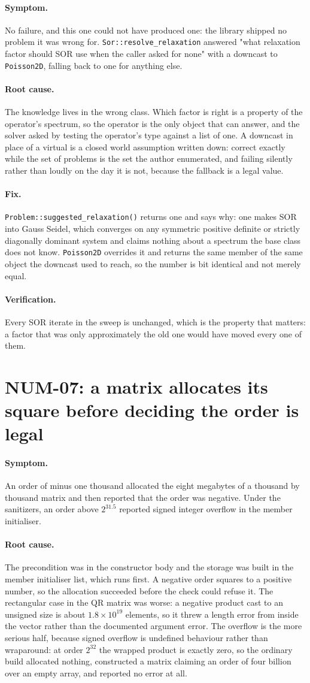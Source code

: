 \documentclass[11pt,a4paper]{report}
\newcommand{\symptom}[1]{\paragraph{Symptom.}#1}
\newcommand{\rootcause}[1]{\paragraph{Root cause.}#1}
\newcommand{\fix}[1]{\paragraph{Fix.}#1}
\newcommand{\verification}[1]{\paragraph{Verification.}#1}
\begin{document}
\symptom{No failure, and this one could not have produced one: the library
shipped no problem it was wrong for. \texttt{Sor::resolve\_relaxation} answered
"what relaxation factor should SOR use when the caller asked for none" with a
downcast to \texttt{Poisson2D}, falling back to one for anything else.}

\rootcause{The knowledge lives in the wrong class. Which factor is right is a
property of the operator's spectrum, so the operator is the only object that can
answer, and the solver asked by testing the operator's type against a list of
one. A downcast in place of a virtual is a closed world assumption written down:
correct exactly while the set of problems is the set the author enumerated, and
failing silently rather than loudly on the day it is not, because the fallback is
a legal value.}

\fix{\texttt{Problem::suggested\_relaxation()} returns one and says why: one
makes SOR into Gauss Seidel, which converges on any symmetric positive definite
or strictly diagonally dominant system and claims nothing about a spectrum the
base class does not know. \texttt{Poisson2D} overrides it and returns the same
member of the same object the downcast used to reach, so the number is bit
identical and not merely equal.}

\verification{Every SOR iterate in the sweep is unchanged, which is the property
that matters: a factor that was only approximately the old one would have moved
every one of them.}

\section{NUM-07: a matrix allocates its square before deciding the order is legal}

\symptom{An order of minus one thousand allocated the eight megabytes of a
thousand by thousand matrix and then reported that the order was negative. Under
the sanitizers, an order above $2^{31.5}$ reported signed integer overflow in the
member initialiser.}

\rootcause{The precondition was in the constructor body and the storage was built
in the member initialiser list, which runs first. A negative order squares to a
positive number, so the allocation succeeded before the check could refuse it.
The rectangular case in the QR matrix was worse: a negative product cast to an
unsigned size is about $1.8\times10^{19}$ elements, so it threw a length error
from inside the vector rather than the documented argument error. The overflow is
the more serious half, because signed overflow is undefined behaviour rather than
wraparound: at order $2^{32}$ the wrapped product is exactly zero, so the
ordinary build allocated nothing, constructed a matrix claiming an order of four
billion over an empty array, and reported no error at all.}
\end{document}
